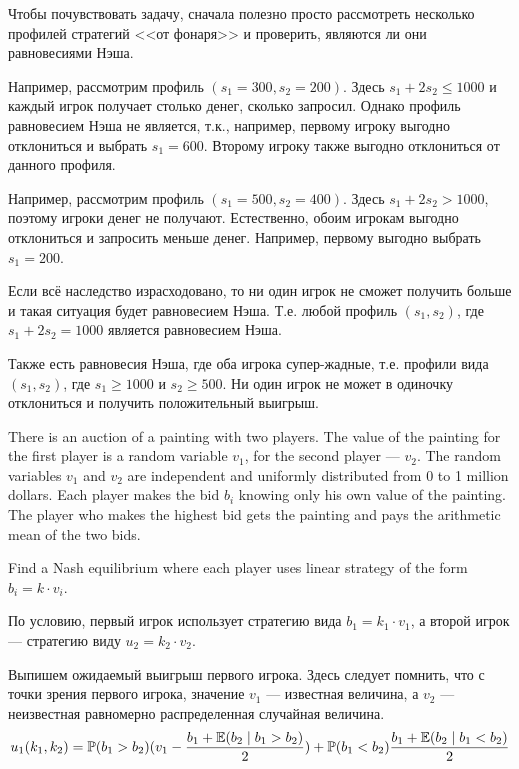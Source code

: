 \begin{solution}
Чтобы почувствовать задачу, сначала полезно просто рассмотреть несколько профилей стратегий <<от фонаря>> и проверить, являются ли они равновесиями Нэша.

Например, рассмотрим профиль $(s_1=300,s_2=200)$. Здесь $s_1+2s_2\leq 1000$ и каждый игрок получает столько денег, сколько запросил. Однако профиль  равновесием Нэша не является, т.к., например, первому игроку выгодно отклониться и выбрать $s_1=600$.  Второму игроку также выгодно отклониться от данного профиля.

Например, рассмотрим профиль $(s_1=500,s_2=400)$. Здесь $s_1+2s_2>1000$, поэтому игроки денег не получают. Естественно, обоим игрокам выгодно отклониться и запросить меньше денег. Например, первому выгодно выбрать $s_1=200$. 

Если всё наследство израсходовано, то ни один игрок не сможет получить больше и такая ситуация будет равновесием Нэша. Т.е. любой профиль $(s_1,s_2)$, где  $s_1+2s_2=1000$ является равновесием Нэша.

Также есть равновесия Нэша, где оба игрока супер-жадные, т.е. профили вида $(s_1,s_2)$, где $s_1\geq 1000$ и $s_2 \geq 500$. Ни один игрок не может в одиночку отклониться и  получить положительный выигрыш.
\end{solution}

\begin{problem}
There is an auction of a painting with two players. The value of the painting for the first player is a random variable $v_1$, for the second player --- $v_2$. The random variables $v_1$ and $v_2$ are independent and uniformly distributed from 0 to 1 million dollars. Each player makes the bid $b_i$ knowing only his own value of the painting. The player who makes the highest bid gets the painting and pays the arithmetic mean of the two bids. 

Find a Nash equilibrium where each player uses linear strategy of the form $b_i=k\cdot v_i$.
\end{problem}

\begin{solution}
По условию, первый игрок использует стратегию вида $b_1=k_1\cdot v_1$, а второй игрок --- стратегию виду $u_2=k_2\cdot v_2$. 

Выпишем ожидаемый выигрыш первого игрока. Здесь следует помнить, что с точки зрения первого игрока, значение $v_1$ --- известная величина, а $v_2$ --- неизвестная равномерно распределенная случайная величина.
\[
u_1(k_1,k_2)=\mathbb{P}(b_1>b_2)(v_1- \frac{b_1+\mathbb{E}(b_2\mid b_1>b_2)}{2}) + \mathbb{P}(b_1<b_2) \frac{b_1+\mathbb{E}(b_2\mid b_1< b_2)}{2}
\]
\end{solution}

